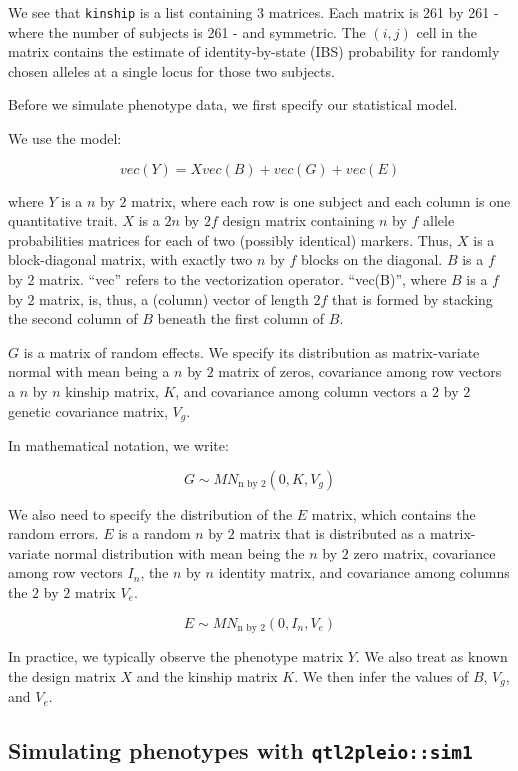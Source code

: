 \documentclass{book}
\begin{document}
We see that \texttt{kinship} is a list containing 3 matrices. Each
matrix is 261 by 261 - where the number of subjects is 261 - and
symmetric. The \((i, j)\) cell in the matrix contains the estimate of
identity-by-state (IBS) probability for randomly chosen alleles at a
single locus for those two subjects.

Before we simulate phenotype data, we first specify our statistical
model.

We use the model:

\[vec(Y) = X vec(B) + vec(G) + vec(E)\]

where \(Y\) is a \(n\) by \(2\) matrix, where each row is one subject
and each column is one quantitative trait. \(X\) is a \(2n\) by \(2f\)
design matrix containing \(n\) by \(f\) allele probabilities matrices
for each of two (possibly identical) markers. Thus, \(X\) is a
block-diagonal matrix, with exactly two \(n\) by \(f\) blocks on the
diagonal. \(B\) is a \(f\) by 2 matrix. ``vec'' refers to the
vectorization operator. ``vec(B)'', where \(B\) is a \(f\) by \(2\)
matrix, is, thus, a (column) vector of length \(2f\) that is formed by
stacking the second column of \(B\) beneath the first column of \(B\).

\(G\) is a matrix of random effects. We specify its distribution as
matrix-variate normal with mean being a \(n\) by \(2\) matrix of zeros,
covariance among row vectors a \(n\) by \(n\) kinship matrix, \(K\), and
covariance among column vectors a \(2\) by \(2\) genetic covariance
matrix, \(V_g\).

In mathematical notation, we write:

\[G \sim MN_{\text{n by 2}}(0, K, V_g)\]

We also need to specify the distribution of the \(E\) matrix, which
contains the random errors. \(E\) is a random \(n\) by \(2\) matrix that
is distributed as a matrix-variate normal distribution with mean being
the \(n\) by \(2\) zero matrix, covariance among row vectors \(I_n\),
the \(n\) by \(n\) identity matrix, and covariance among columns the
\(2\) by \(2\) matrix \(V_e\).

\[E \sim MN_{\text{n by 2}}(0, I_n, V_e)\]

In practice, we typically observe the phenotype matrix \(Y\). We also
treat as known the design matrix \(X\) and the kinship matrix \(K\). We
then infer the values of \(B\), \(V_g\), and \(V_e\).

\hypertarget{simulating-phenotypes-with-qtl2pleiosim1}{%
\subsection{\texorpdfstring{Simulating phenotypes with
\texttt{qtl2pleio::sim1}}{Simulating phenotypes with qtl2pleio::sim1}}\label{simulating-phenotypes-with-qtl2pleiosim1}}
\end{document}
